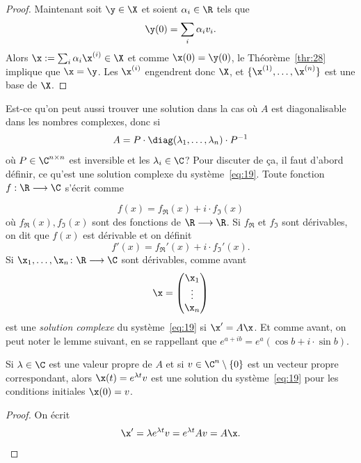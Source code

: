 {\begin{proof}
Maintenant soit $\y \in \X$ et soient  $\alpha_i \in \R$  tels que 
\begin{displaymath}
  \y(0) = \sum_i \alpha_i v_i.  
\end{displaymath}
Alors $\x := \sum_i \alpha_i \x^{(i)} \in \X$  et comme $\x(0) = \y(0)$, le Théorème~\ref{thr:28} implique que $\x = \y$. Les $\x^{(i)}$ engendrent donc $\X$, et $\{\x^{(1)},\dots, \x^{(n)}\}$ est une base de $\X$. 
\end{proof}


Est-ce qu'on peut aussi trouver une solution dans la cas où $A$ est diagonalisable dans les nombres complexes, donc si 
\begin{displaymath}
A=P \cdot \diag(\lambda_1,\dots,\lambda_n) \cdot P^{-1} 
\end{displaymath}
où $P \in \C^{n \times n}$ est inversible et les  $\lambda_i \in \C$? Pour discuter de ça, il faut d'abord définir, ce qu'est une solution complexe du système~\eqref{eq:19}. Toute fonction $f: \R \longrightarrow \C$ s'écrit comme 

\begin{displaymath}
  f(x) = f_{\Re}(x) + i \cdot f_{\Im}(x) 
\end{displaymath}
où $f_{\Re}(x), f_{\Im}(x)$ sont des fonctions de $ \R \longrightarrow \R$.  Si $f_\Re$ et $f_\Im$ sont dérivables, on dit que $f(x)$ est dérivable et on définit 
\begin{displaymath}
  f'(x) = f_\Re'(x) + i \cdot f_\Im'(x). 
\end{displaymath}
Si $\x_1,\dots,\x_n\colon \R \longrightarrow \C$ sont dérivables, comme avant 
\begin{displaymath}
  \x =
  \begin{pmatrix}
    \x_1\\ \vdots \\ \x_n
  \end{pmatrix}
\end{displaymath}
est une \emph{solution complexe} du système~\eqref{eq:19} si $\x' = A\x$.   Et comme avant, on peut noter le lemme suivant, en se rappellant que $e^{a + ib} = e^a (\cos b + i \cdot \sin b)$. 


\begin{lemma}
  \label{lem:15}
  Si $\lambda \in \C$ est une valeur propre de $A$ et si $v \in \C^n \setminus \{0\}$ est un vecteur propre correspondant, alors $\x(t) = e^{\lambda t} v$ est  une solution du système~\eqref{eq:19} pour les conditions initiales $\x(0) = v$. 
\end{lemma}
\begin{proof}
  On écrit 
  \begin{displaymath}
    \x' = \lambda e^{\lambda t} v = e^{\lambda t} Av = A\x.
  \end{displaymath}
\end{proof}


}
